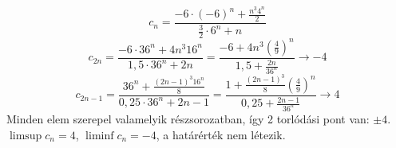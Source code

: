 \documentclass[11pt]{scrartcl}
\begin{document}
\[
	c_n = \frac{-6 \cdot (-6)^n + \frac{n^3 4^n}{2}}{\frac{3}{2} \cdot 6^n + n}
\]
\[
	c_{2n}
	= \frac{-6 \cdot 36^n + 4n^3 16^n}{1{,}5 \cdot 36^n + 2n}
	= \frac{-6 + 4n^3 \left(\frac{4}{9}\right)^n}{1{,}5 + \frac{2n}{36^n}}
	\to -4
\]
\[
	c_{2n - 1}
	= \frac{36^n + \frac{(2n - 1)^3 16^n}{8}}{0{,}25 \cdot 36^n + 2n - 1}
	= \frac{1 + \frac{(2n - 1)^3}{8} \left(\frac{4}{9}\right)^n}{0{,}25 + \frac{2n - 1}{36^n}}
	\to 4
\]
Minden elem szerepel valamelyik részsorozatban, így 2 torlódási pont van:
$\pm 4$. $\limsup c_n = 4$, $\liminf c_n = -4$, a határérték nem létezik.
\end{document}
